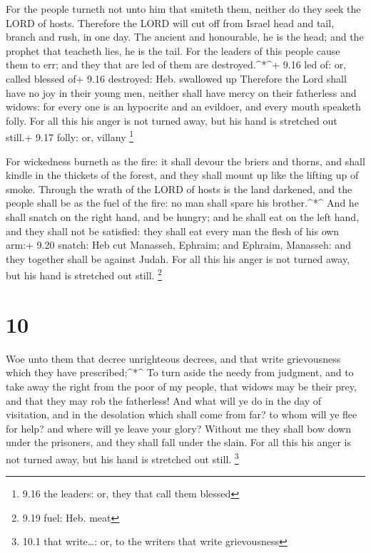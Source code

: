  For the people turneth not unto him that smiteth them,
neither do they seek the LORD of hosts.  Therefore the LORD
will cut off from Israel head and tail, branch and rush, in one day.
 The ancient and honourable, he is the head; and the
prophet that teacheth lies, he is the tail.  For the
leaders of this people cause them to err; and they that are led of them
are destroyed.\^{}*\^{}+ 9.16 led of: or, called blessed of+ 9.16
destroyed: Heb. swallowed up  Therefore the Lord shall have
no joy in their young men, neither shall have mercy on their fatherless
and widows: for every one is an hypocrite and an evildoer, and every
mouth speaketh folly. For all this his anger is not turned away, but his
hand is stretched out still.+ 9.17 folly: or, villany \footnote{9.16 the
  leaders: or, they that call them blessed}

 For wickedness burneth as the fire: it shall devour the
briers and thorns, and shall kindle in the thickets of the forest, and
they shall mount up like the lifting up of smoke.  Through
the wrath of the LORD of hosts is the land darkened, and the people
shall be as the fuel of the fire: no man shall spare his
brother.\^{}*\^{}  And he shall snatch on the right hand,
and be hungry; and he shall eat on the left hand, and they shall not be
satisfied: they shall eat every man the flesh of his own arm:+ 9.20
snatch: Heb cut  Manasseh, Ephraim; and Ephraim, Manasseh:
and they together shall be against Judah. For all this his anger is not
turned away, but his hand is stretched out still. \footnote{9.19 fuel:
  Heb. meat}

\hypertarget{section-9}{%
\section{10}\label{section-9}}

 Woe unto them that decree unrighteous decrees, and that
write grievousness which they have prescribed;\^{}*\^{}  To
turn aside the needy from judgment, and to take away the right from the
poor of my people, that widows may be their prey, and that they may rob
the fatherless!  And what will ye do in the day of
visitation, and in the desolation which shall come from far? to whom
will ye flee for help? and where will ye leave your glory? 
Without me they shall bow down under the prisoners, and they shall fall
under the slain. For all this his anger is not turned away, but his hand
is stretched out still. \footnote{10.1 that write\ldots: or, to the
  writers that write grievousness}

